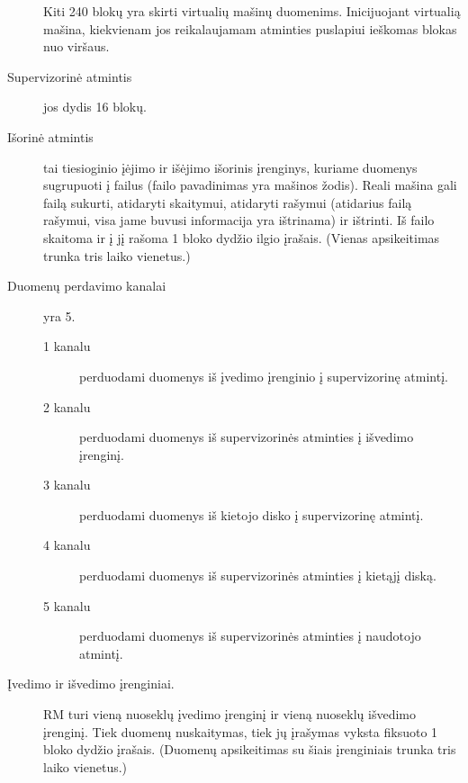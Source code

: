 \begin{description}
    Kiti 240 blokų yra skirti virtualių mašinų duomenims. 
    Inicijuojant virtualią mašina, kiekvienam jos reikalaujamam atminties
    puslapiui ieškomas blokas nuo viršaus.
  \item[Supervizorinė atmintis] jos dydis 16 blokų.
  \item[Išorinė atmintis] tai tiesioginio įėjimo ir išėjimo išorinis
    įrenginys, kuriame duomenys sugrupuoti į failus (failo pavadinimas
    yra mašinos žodis). Reali mašina gali failą sukurti, atidaryti
    skaitymui, atidaryti rašymui (atidarius failą rašymui, visa 
    jame buvusi informacija yra ištrinama) ir ištrinti. Iš failo skaitoma
    ir į jį rašoma 1 bloko dydžio ilgio įrašais. (Vienas apsikeitimas 
    trunka tris laiko vienetus.)
  \item[Duomenų perdavimo kanalai] yra 5. 
    \begin{description}
      \item[1 kanalu] perduodami duomenys iš įvedimo įrenginio į 
        supervizorinę atmintį.
      \item[2 kanalu] perduodami duomenys iš supervizorinės atminties
        į išvedimo įrenginį.
      \item[3 kanalu] perduodami duomenys iš kietojo disko į supervizorinę
        atmintį.
      \item[4 kanalu] perduodami duomenys iš supervizorinės atminties į 
        kietąjį diską.
      \item[5 kanalu] perduodami duomenys iš supervizorinės atminties į 
        naudotojo atmintį.
    \end{description}
  \item[Įvedimo ir išvedimo įrenginiai.] RM turi vieną nuoseklų įvedimo
    įrenginį ir vieną nuoseklų išvedimo įrenginį. Tiek duomenų nuskaitymas,
    tiek jų įrašymas vyksta fiksuoto 1 bloko dydžio įrašais. (Duomenų
    apsikeitimas su šiais įrenginiais trunka tris laiko vienetus.)
\end{description}
